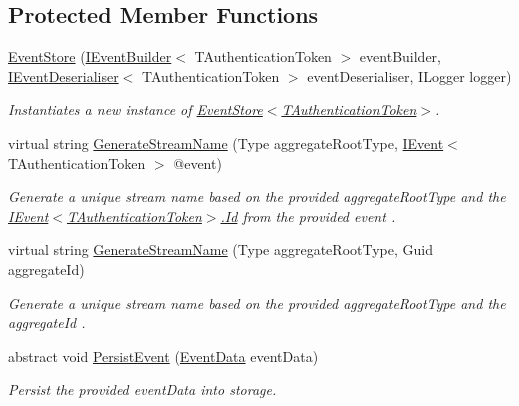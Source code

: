 \subsection*{Protected Member Functions}
\begin{DoxyCompactItemize}
\item 
\hyperlink{classCqrs_1_1Events_1_1EventStore_a6346cb2aea4c5b4e740dc6cfb15abab8_a6346cb2aea4c5b4e740dc6cfb15abab8}{Event\+Store} (\hyperlink{interfaceCqrs_1_1Events_1_1IEventBuilder}{I\+Event\+Builder}$<$ T\+Authentication\+Token $>$ event\+Builder, \hyperlink{interfaceCqrs_1_1Events_1_1IEventDeserialiser}{I\+Event\+Deserialiser}$<$ T\+Authentication\+Token $>$ event\+Deserialiser, I\+Logger logger)
\begin{DoxyCompactList}\small\item\em Instantiates a new instance of \hyperlink{classCqrs_1_1Events_1_1EventStore_a6346cb2aea4c5b4e740dc6cfb15abab8_a6346cb2aea4c5b4e740dc6cfb15abab8}{Event\+Store$<$\+T\+Authentication\+Token$>$}. \end{DoxyCompactList}\item 
virtual string \hyperlink{classCqrs_1_1Events_1_1EventStore_a03df06d4ce9c6d16201c079f2de0a7f3_a03df06d4ce9c6d16201c079f2de0a7f3}{Generate\+Stream\+Name} (Type aggregate\+Root\+Type, \hyperlink{interfaceCqrs_1_1Events_1_1IEvent}{I\+Event}$<$ T\+Authentication\+Token $>$ @event)
\begin{DoxyCompactList}\small\item\em Generate a unique stream name based on the provided {\itshape aggregate\+Root\+Type}  and the \hyperlink{interfaceCqrs_1_1Events_1_1IEvent_a2974e13d307c62c5cc438d668ff1783b_a2974e13d307c62c5cc438d668ff1783b}{I\+Event$<$\+T\+Authentication\+Token$>$.\+Id} from the provided {\itshape event} . \end{DoxyCompactList}\item 
virtual string \hyperlink{classCqrs_1_1Events_1_1EventStore_aba61739e47fdd0f7fce656f896cbe908_aba61739e47fdd0f7fce656f896cbe908}{Generate\+Stream\+Name} (Type aggregate\+Root\+Type, Guid aggregate\+Id)
\begin{DoxyCompactList}\small\item\em Generate a unique stream name based on the provided {\itshape aggregate\+Root\+Type}  and the {\itshape aggregate\+Id} . \end{DoxyCompactList}\item 
abstract void \hyperlink{classCqrs_1_1Events_1_1EventStore_aedb71ca0ddf21220e323bc60ad7508cd_aedb71ca0ddf21220e323bc60ad7508cd}{Persist\+Event} (\hyperlink{classCqrs_1_1Events_1_1EventData}{Event\+Data} event\+Data)
\begin{DoxyCompactList}\small\item\em Persist the provided {\itshape event\+Data}  into storage. \end{DoxyCompactList}\end{DoxyCompactItemize}

